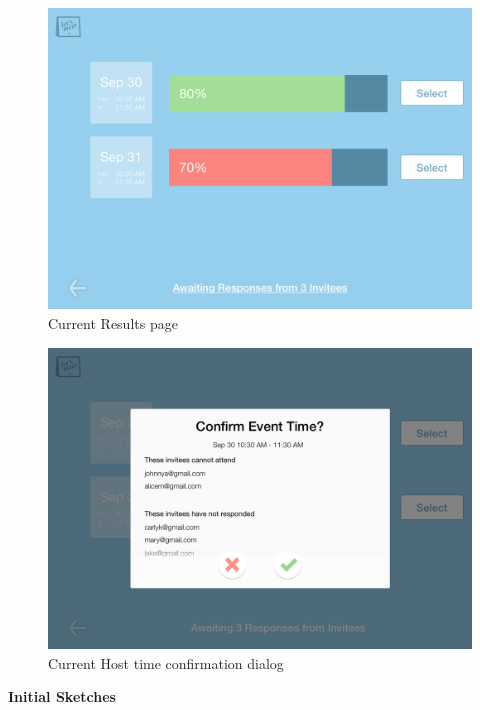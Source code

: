 \documentclass{sigchi}
\begin{document}
\begin{figure}
  \centering
  \includegraphics[width=1.75\columnwidth]{Mockup/Results}
  \caption{Current Results page}
\end{figure}

\begin{figure}
  \centering
  \includegraphics[width=1.75\columnwidth]{Mockup/ResultsSelectDialog}
  \caption{Current Host time confirmation dialog}
\end{figure}
\textbf{Initial Sketches}
\FloatBarrier




\balance{}

\newpage



\end{document}
